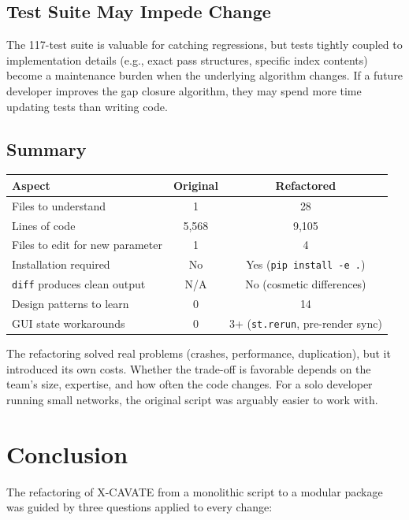 \documentclass[11pt,a4paper]{article}
\begin{document}
\subsection{Test Suite May Impede Change}

The 117-test suite is valuable for catching regressions, but tests tightly coupled to implementation details (e.g., exact pass structures, specific index contents) become a maintenance burden when the underlying algorithm changes. If a future developer improves the gap closure algorithm, they may spend more time updating tests than writing code.

\subsection{Summary}

\begin{center}
\begin{tabular}{lcc}
\toprule
\textbf{Aspect} & \textbf{Original} & \textbf{Refactored} \\
\midrule
Files to understand & 1 & 28 \\
Lines of code & 5,568 & 9,105 \\
Files to edit for new parameter & 1 & 4 \\
Installation required & No & Yes (\texttt{pip install -e .}) \\
\texttt{diff} produces clean output & N/A & No (cosmetic differences) \\
Design patterns to learn & 0 & 14 \\
GUI state workarounds & 0 & 3+ (\texttt{st.rerun}, pre-render sync) \\
\bottomrule
\end{tabular}
\end{center}

The refactoring solved real problems (crashes, performance, duplication), but it introduced its own costs. Whether the trade-off is favorable depends on the team's size, expertise, and how often the code changes. For a solo developer running small networks, the original script was arguably easier to work with.


\section{Conclusion}

The refactoring of X-CAVATE from a monolithic script to a modular package was guided by three questions applied to every change:
\end{document}
